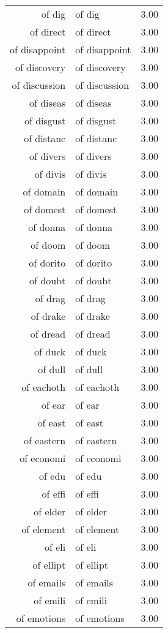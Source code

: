\begin{table}[ht]
\begin{tabular}{rlr}
  of dig & of dig & 3.00 \\ 
  of direct & of direct & 3.00 \\ 
  of disappoint & of disappoint & 3.00 \\ 
  of discovery & of discovery & 3.00 \\ 
  of discussion & of discussion & 3.00 \\ 
  of diseas & of diseas & 3.00 \\ 
  of disgust & of disgust & 3.00 \\ 
  of distanc & of distanc & 3.00 \\ 
  of divers & of divers & 3.00 \\ 
  of divis & of divis & 3.00 \\ 
  of domain & of domain & 3.00 \\ 
  of domest & of domest & 3.00 \\ 
  of donna & of donna & 3.00 \\ 
  of doom & of doom & 3.00 \\ 
  of dorito & of dorito & 3.00 \\ 
  of doubt & of doubt & 3.00 \\ 
  of drag & of drag & 3.00 \\ 
  of drake & of drake & 3.00 \\ 
  of dread & of dread & 3.00 \\ 
  of duck & of duck & 3.00 \\ 
  of dull & of dull & 3.00 \\ 
  of eachoth & of eachoth & 3.00 \\ 
  of ear & of ear & 3.00 \\ 
  of east & of east & 3.00 \\ 
  of eastern & of eastern & 3.00 \\ 
  of economi & of economi & 3.00 \\ 
  of edu & of edu & 3.00 \\ 
  of effi & of effi & 3.00 \\ 
  of elder & of elder & 3.00 \\ 
  of element & of element & 3.00 \\ 
  of eli & of eli & 3.00 \\ 
  of ellipt & of ellipt & 3.00 \\ 
  of emails & of emails & 3.00 \\ 
  of emili & of emili & 3.00 \\ 
  of emotions & of emotions & 3.00 \\ 

\end{tabular}
\end{table}
